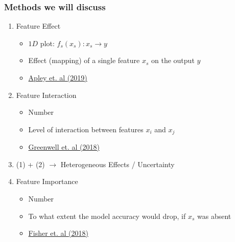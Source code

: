 \begin{frame}
  \frametitle{Methods we will discuss}

  \begin{enumerate}
  \item Feature Effect
    \begin{itemize}
      \item $1D$ plot: \(f_s(x_s): x_s \rightarrow y\)
      \item Effect (mapping) of a single feature \(x_s\) on the output \(y\)
      \item \href{https://arxiv.org/abs/1612.08468}{Apley et. al (2019)}
    \end{itemize}
  \item Feature Interaction
    \begin{itemize}
    \item Number
    \item Level of interaction between features \(x_i\) and \(x_j\)
    \item \href{https://arxiv.org/abs/1805.04755}{Greenwell et. al (2018)}
    \end{itemize}
  \item (1) + (2) $\rightarrow$ Heterogeneous Effects / Uncertainty
  \item Feature Importance
    \begin{itemize}
      \item Number
      \item To what extent the model accuracy would drop, if \(x_s\) was absent
        \item \href{https://arxiv.org/abs/1801.01489}{Fisher et. al (2018)}
    \end{itemize}

  \end{enumerate}

\end{frame}
